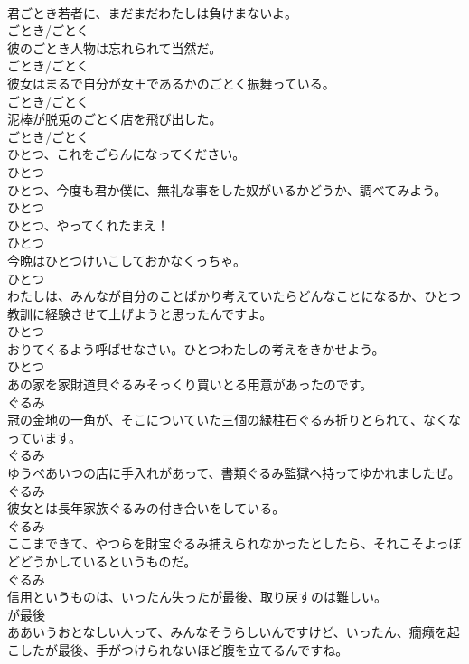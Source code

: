 \documentclass[8pt]{extreport}
\begin{document}
\begin{CJK}{UTF8}{min}
\\	君ごとき若者に、まだまだわたしは負けまないよ。	
\\	ごとき/ごとく
\\	彼のごとき人物は忘れられて当然だ。	
\\	ごとき/ごとく
\\	彼女はまるで自分が女王であるかのごとく振舞っている。	
\\	ごとき/ごとく
\\	泥棒が脱兎のごとく店を飛び出した。	
\\	ごとき/ごとく
\\	ひとつ、これをごらんになってください。	
\\	ひとつ
\\	ひとつ、今度も君か僕に、無礼な事をした奴がいるかどうか、調べてみよう。	
\\	ひとつ
\\	ひとつ、やってくれたまえ！	
\\	ひとつ
\\	今晩はひとつけいこしておかなくっちゃ。	
\\	ひとつ
\\	わたしは、みんなが自分のことばかり考えていたらどんなことになるか、ひとつ教訓に経験させて上げようと思ったんですよ。	
\\	ひとつ
\\	おりてくるよう呼ばせなさい。ひとつわたしの考えをきかせよう。	
\\	ひとつ
\\	あの家を家財道具ぐるみそっくり買いとる用意があったのです。	
\\	ぐるみ
\\	冠の金地の一角が、そこについていた三個の緑柱石ぐるみ折りとられて、なくなっています。	
\\	ぐるみ
\\	ゆうべあいつの店に手入れがあって、書類ぐるみ監獄へ持ってゆかれましたぜ。	
\\	ぐるみ
\\	彼女とは長年家族ぐるみの付き合いをしている。	
\\	ぐるみ
\\	ここまできて、やつらを財宝ぐるみ捕えられなかったとしたら、それこそよっぽどどうかしているというものだ。	
\\	ぐるみ
\\	信用というものは、いったん失ったが最後、取り戻すのは難しい。	
\\	が最後
\\	ああいうおとなしい人って、みんなそうらしいんですけど、いったん、癇癪を起こしたが最後、手がつけられないほど腹を立てるんですね。	

\end{CJK}
\end{document}
